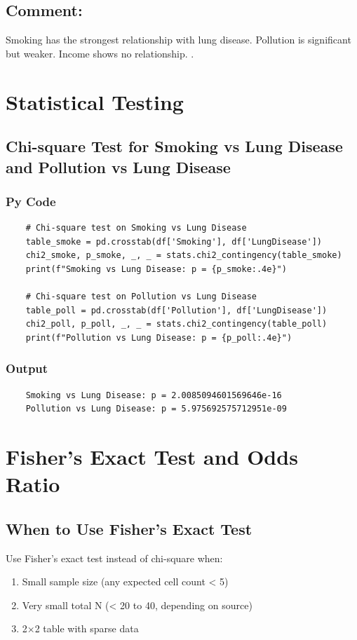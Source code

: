 \documentclass[a4paper,12pt]{article}
\begin{document}
\subsection{Comment:}
 
Smoking has the strongest relationship with lung disease. Pollution is significant but weaker. 
Income shows no relationship. .

\section{Statistical Testing}

\subsection{Chi-square Test for Smoking vs Lung Disease and Pollution vs Lung Disease}

\subsubsection{Py Code}
\begin{lstlisting}
	# Chi-square test on Smoking vs Lung Disease
	table_smoke = pd.crosstab(df['Smoking'], df['LungDisease'])
	chi2_smoke, p_smoke, _, _ = stats.chi2_contingency(table_smoke)
	print(f"Smoking vs Lung Disease: p = {p_smoke:.4e}")
	
	# Chi-square test on Pollution vs Lung Disease
	table_poll = pd.crosstab(df['Pollution'], df['LungDisease'])
	chi2_poll, p_poll, _, _ = stats.chi2_contingency(table_poll)
	print(f"Pollution vs Lung Disease: p = {p_poll:.4e}")
\end{lstlisting}

\subsubsection{Output}
\begin{verbatim}
	Smoking vs Lung Disease: p = 2.0085094601569646e-16
	Pollution vs Lung Disease: p = 5.975692575712951e-09
\end{verbatim}
\section{Fisher's Exact Test and Odds Ratio}

\subsection{When to Use Fisher's Exact Test}
Use Fisher's exact test instead of chi-square when:
\begin{enumerate}
	\item Small sample size (any expected cell count < 5)
	\item Very small total N (< 20 to 40, depending on source)
	\item 2×2 table with sparse data
\end{enumerate}
\end{document}
